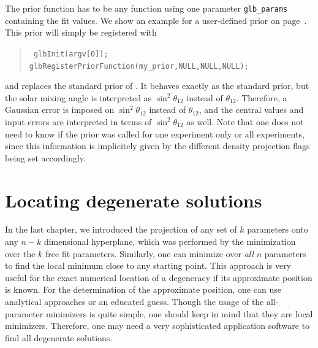 The prior function has to be any function using one parameter {\tt glb\_params} containing the fit values.
We show an example for a user-defined prior on page~\pageref{ex:userprior}. This prior
will simply be registered with
\begin{quote}
{\tt
 glbInit(argv[0]); \\
 glbRegisterPriorFunction(my\_prior,NULL,NULL,NULL);
}
\end{quote}
and replaces the standard prior of \GLOBES . It behaves exactly as the standard prior, but
the solar mixing angle is interpreted as $\sin^2 \theta_{12}$ instead of $\theta_{12}$. Therefore,
a Gaussian error is imposed on $\sin^2 \theta_{12}$ instead of $\theta_{12}$, and the central
values and input errors are interpreted in terms of $\sin^2 \theta_{12}$ as well. Note that
one does not need to know if the prior was called for one experiment only or all experiments,
since this information is implicitely given by the different density projection flags being set
accordingly. 

\chapter{Locating degenerate solutions}

In the last chapter, we introduced the projection of any set of $k$ parameters onto any $n-k$ dimensional hyperplane, which was performed by the minimization over the $k$ free fit parameters. Similarly, one can minimize over {\em all} $n$ parameters to find the local minimum close to any starting point. This approach is very useful for the exact numerical location of a degeneracy if its approximate position is known. For the determination of the approximate position, one can use analytical approaches or an educated guess. 
Though the usage of the all-parameter minimizers is quite simple, one should keep in mind that they are local minimizers. Therefore, one may need a very sophisticated application software to find all degenerate solutions.

